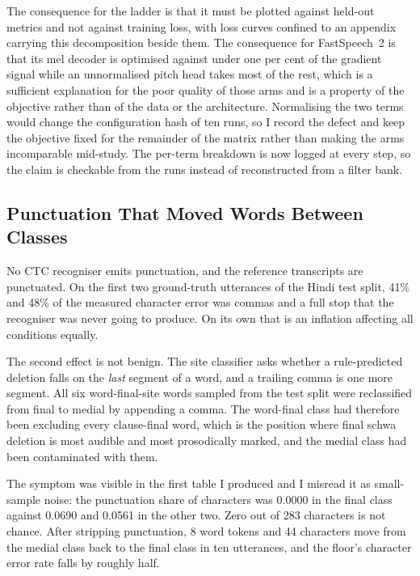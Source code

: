 \documentclass[runningheads]{llncs}
\begin{document}
The consequence for the ladder is that it must be plotted against held-out
metrics and not against training loss, with loss curves confined to an
appendix carrying this decomposition beside them. The consequence for
FastSpeech~2 is that its mel decoder is optimised against under one per cent of
the gradient signal while an unnormalised pitch head takes most of the rest,
which is a sufficient explanation for the poor quality of those arms and is a
property of the objective rather than of the data or the architecture.
Normalising the two terms would change the configuration hash of ten runs, so
I record the defect and keep the objective fixed for the remainder of the
matrix rather than making the arms incomparable mid-study. The per-term
breakdown is now logged at every step, so the claim is checkable from the runs
instead of reconstructed from a filter bank.

\subsection{Punctuation That Moved Words Between Classes}
\label{sec:punct}

No CTC recogniser emits punctuation, and the reference transcripts are
punctuated. On the first two ground-truth utterances of the Hindi test split,
41\% and 48\% of the measured character error was commas and a full stop that
the recogniser was never going to produce. On its own that is an inflation
affecting all conditions equally.

The second effect is not benign. The site classifier asks whether a
rule-predicted deletion falls on the \emph{last} segment of a word, and a
trailing comma is one more segment. All six word-final-site words sampled from
the test split were reclassified from final to medial by appending a comma. The
word-final class had therefore been excluding every clause-final word, which is
the position where final schwa deletion is most audible and most prosodically
marked, and the medial class had been contaminated with them.

The symptom was visible in the first table I produced and I misread it as
small-sample noise: the punctuation share of characters was 0.0000 in the
final class against 0.0690 and 0.0561 in the other two. Zero out of 283
characters is not chance. After stripping punctuation, 8 word tokens and 44
characters move from the medial class back to the final class in ten
utterances, and the floor's character error rate falls by roughly half.
\end{document}
